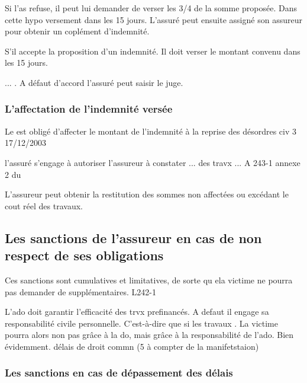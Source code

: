 			Si l'as refuse, il peut lui demander de verser les 3/4 de la somme proposée. Dans cette hypo versement dans les 15 jours. L'assuré peut ensuite assigné son assureur pour obtenir un coplément d'indemnité.

			S'il accepte la proposition d'un indemnité. Il doit verser le montant convenu dans les 15 jours.

			... . A défaut d'accord l'assuré peut saisir le juge.

		\subsubsection{L'affectation de l'indemnité versée}

			Le \Mo est obligé d'affecter le montant de l'indemnité à la reprise des désordres civ 3 17/12/2003

			l'assuré s'engage à autoriser l'assureur à constater ... des travx ... A 243-1 annexe 2 du \ca

			L'assureur peut obtenir la restitution des sommes non affectées ou excédant le cout réel des travaux.

	\subsection{Les sanctions de l'assureur en cas de non respect de ses obligations}

		Ces sanctions sont cumulatives et limitatives, de sorte qu ela victime ne pourra pas demander de \di supplémentaires. L242-1

		L'ado doit garantir l'efficacité des trvx prefinancés. A defaut il engage sa responsabilité civile personnelle. C'est-à-dire que si les travaux . La victime pourra alors non pas grâce à la do, mais grâce à la responsabilité de l'ado. Bien évidemment. délais de droit commn (5 à compter de la manifetstaion)

		\subsubsection{Les sanctions en cas de dépassement des délais}

